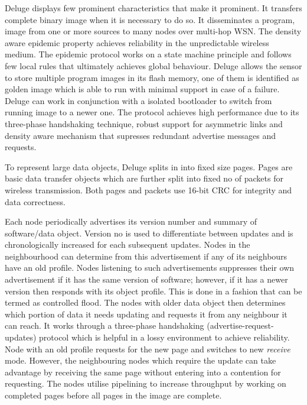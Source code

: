 \documentclass[conference,final]{IEEEtran}
\newcommand{\dme}[2]{\pdfmarkupcomment[markup=Highlight,color=yellow]{#1}{#2}}
\begin{document}
Deluge displays few prominent characteristics that make it prominent.
It transfers complete binary image when it is necessary to do so. 
It disseminates a program, image from one or more sources to many nodes over multi-hop WSN.
The density aware epidemic property achieves reliability in the unpredictable wireless medium.
The epidemic protocol works on a state machine principle and follows few local rules that ultimately achieves global behaviour.
Deluge allows the sensor to store multiple program images in its flash memory, one of them is identified as golden image which is able to run with minimal support in case of a failure.
Deluge can work in conjunction with a isolated bootloader to switch from running image to a newer one.
The protocol achieves high performance due to its three-phase handshaking technique, robust support for asymmetric links and density aware mechanism that supresses redundant advertise messages and requests. 

To represent large data objects, Deluge splits in into fixed size pages.
Pages are basic data transfer objects which are further split into fixed no of packets for wireless transmission.
Both pages and packets use 16-bit CRC for integrity and data correctness.

Each node periodically advertises its version number and summary of software/data object.
Version no is used to differentiate between updates and is chronologically increased for each subsequent updates.
Nodes in the neighbourhood can determine from this advertisement if any of its neighbours have an old profile. 
Nodes listening to such advertisements suppresses their own advertisement if it has the same version of software; however, if it has a newer version then responds with its object profile.
This is done in a fashion that can be termed as controlled flood.
The nodes with older data object then determines which portion of data it needs updating and requests it from any neighbour it can reach.
It works through a three-phase handshaking (advertise-request-updates) protocol which is helpful in a lossy environment to achieve reliability. 
Node with an old profile requests for the new page and switches to new \textit{receive} mode.
However, the neighbouring nodes which require the update can take advantage by receiving the same page without entering into a contention for requesting. 
The nodes utilise pipelining to increase throughput by working on completed pages before all pages in the image are complete.
\end{document}
